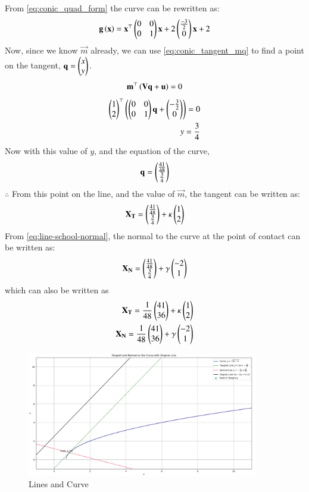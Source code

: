 \documentclass[journal]{IEEEtran}
\begin{document}
From \eqref{eq:conic_quad_form} the curve can be rewritten as:
\begin{align}
    \mathbf{g}\left(\mathbf{x}\right) = \mathbf{x}^\top \begin{pmatrix}0&0\\0&1\end{pmatrix}\mathbf{x} + 2\begin{pmatrix}\frac{-3}{2}\\0\end{pmatrix}\mathbf{x}+2
\end{align}
Now, since we know $\vec{m}$ already, we can use \eqref{eq:conic_tangent_mq} to find a point on the tangent, $\mathbf{q}=\begin{pmatrix}x\\y\end{pmatrix}$.
\begin{align}
    \mathbf{m}^{\top}\left(\mathbf{V}\mathbf{q}+\mathbf{u}\right)=0
\end{align}
\begin{align}
    \begin{pmatrix}1\\2\end{pmatrix}^{\top}\left(\begin{pmatrix}0&0\\0&1\end{pmatrix}\mathbf{q}+\begin{pmatrix}-\frac{3}{2}\\0\end{pmatrix}\right)=0\\
    y=\frac{3}{4}
\end{align}
Now with this value of $y$, and the equation of the curve,
\begin{align}
    \mathbf{q}=\begin{pmatrix}\frac{41}{48}\\ \frac{3}{4}\end{pmatrix}
\end{align}
$\therefore$ From this point on the line, and the value of $\vec{m}$, the tangent can be written as:
\begin{align}
    \mathbf{X_T}=\begin{pmatrix}\frac{41}{48}\\\frac{3}{4}\end{pmatrix} + \kappa \begin{pmatrix}1\\2\end{pmatrix}
\end{align}
From \eqref{eq:line-school-normal}, the normal to the curve at the point of contact can be written as:
\begin{align}
	\mathbf{X_N}=\begin{pmatrix}\frac{41}{48}\\\frac{3}{4}\end{pmatrix} + \gamma \begin{pmatrix}-2\\1\end{pmatrix}
\end{align}
which can also be written as
\begin{align}
	\mathbf{X_T}=\frac{1}{48}\begin{pmatrix}41\\36\end{pmatrix} + \kappa \begin{pmatrix}1\\2\end{pmatrix} \\
	\mathbf{X_N}=\frac{1}{48}\begin{pmatrix}41\\36\end{pmatrix} + \gamma \begin{pmatrix}-2\\1\end{pmatrix}
\end{align}

\begin{figure}[h!]
\begin{center}
	\includegraphics[width=0.9\textwidth]{figs/Figure_1.png}
	\caption{Lines and Curve}
	\label{fig:9-9.3-15 - Figure -1}
\end{center}
\end{figure}
\end{document}
